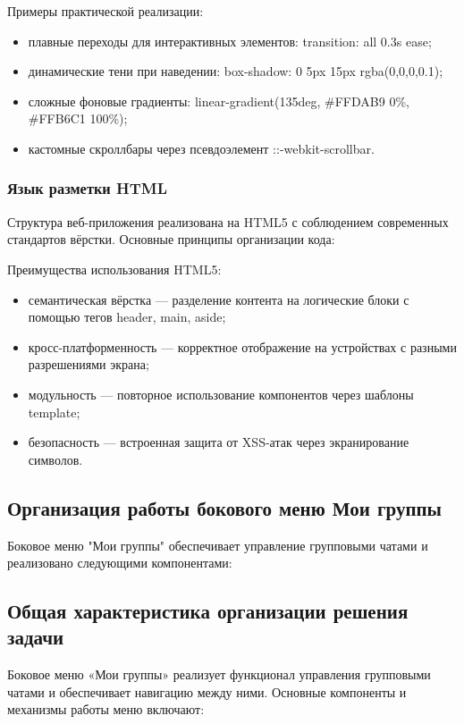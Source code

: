 Примеры практической реализации:
\begin{itemize}
	\item плавные переходы для интерактивных элементов: transition: all 0.3s ease;
	\item динамические тени при наведении: box-shadow: 0 5px 15px rgba(0,0,0,0.1);
	\item сложные фоновые градиенты: linear-gradient(135deg, \#FFDAB9 0\%, \#FFB6C1 100\%);
	\item кастомные скроллбары через псевдоэлемент ::-webkit-scrollbar.
\end{itemize}

\subsubsection{Язык разметки HTML}

Структура веб-приложения реализована на HTML5 с соблюдением современных стандартов вёрстки. Основные принципы организации кода:

Преимущества использования HTML5:  
\begin{itemize}
	\item семантическая вёрстка — разделение контента на логические блоки с помощью тегов header, main, aside;
	\item кросс-платформенность — корректное отображение на устройствах с разными разрешениями экрана;
	\item модульность — повторное использование компонентов через шаблоны template;
	\item безопасность — встроенная защита от XSS-атак через экранирование символов.
\end{itemize}

\subsection{Организация работы бокового меню Мои группы}
Боковое меню "Мои группы" обеспечивает управление групповыми чатами и реализовано следующими компонентами:

\subsection{Общая характеристика организации решения задачи}

Боковое меню «Мои группы» реализует функционал управления групповыми чатами и обеспечивает навигацию между ними. Основные компоненты и механизмы работы меню включают:

